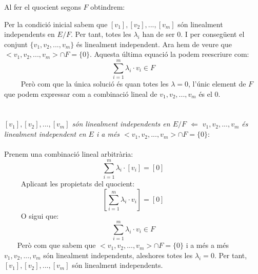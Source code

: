 \documentclass{article}
\begin{document}
Al fer el quocient segons $F$ obtindrem:

Per la condici\'o inicial sabem que $\left[v_1 \right], \left[ v_2 \right], ... , \left[ v_m \right] $ s\'on linealment independents en $E/F$. Per tant, totes les $\lambda_i$ han de ser $0$. I per conseg\"uent el conjunt $\{ v_1, v_2 , ... , v_m \}$ \'es linealment independent. Ara hem de veure que $< v_1, v_2 , ... , v_m>\cap F = \{0\}$. Aquesta \'ultima equaci\'o la podem reescriure com:
\begin{equation*}
\sum_{i=1}^{m} {\lambda_i \cdot v_i} \in F
\end{equation*}
~~~~ Per\`o com que la \'unica soluci\'o \'es quan totes les $\lambda = 0$, l'\'unic element de $F$ que podem expressar com a combinaci\'o lineal de $v_1, v_2 , ... , v_m$ \'es el 0. \\ \\ \\ \indent
\emph{$\left[v_1 \right], \left[ v_2 \right], ... , \left[ v_m \right] $ s\'on linealment independents en $E/F$ $\Leftarrow$ $v_1, v_2 , ... , v_m$ \'es linealment independent en $E$ i a m\'es $< v_1, v_2 , ... , v_m>\cap F = \{0\}$}: \\ \\ \indent
Prenem una combinaci\'o lineal arbitr\`aria:
\begin{equation*}
\sum_{i=1}^{m} {\lambda_i \cdot \left[v_i \right]} = \left[ 0 \right]
\end{equation*} ~~~~
Aplicant les propietats del quocient:
\begin{equation*}
\left[ \sum_{i=1}^{m} {\lambda_i \cdot v_i} \right]= \left[0 \right]
\end{equation*} ~~~~
O sigui que:
\begin{equation*}
\sum_{i=1}^{m} {\lambda_i \cdot v_i} \in F
\end{equation*}~~~ Per\`o com que sabem que $< v_1, v_2 , ... , v_m>\cap F = \{0\}$ i a m\'es a m\'es $v_1, v_2 , ... , v_m$ s\'on linealment independents, aleshores totes les $\lambda_i = 0$. Per tant, $ \left[v_1 \right], \left[ v_2 \right], ... , \left[ v_m \right]$ s\'on linealment independents.
\end{document}
